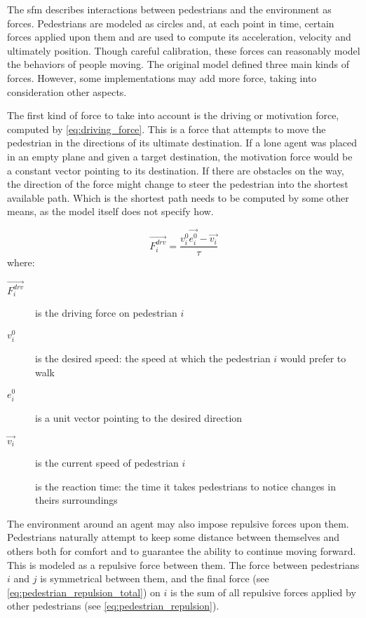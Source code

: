 \documentclass[twoside, 11pt]{article}
\begin{document}
The \gls{sfm} describes interactions between pedestrians and the environment as forces. Pedestrians are modeled as circles and, at each point in time, certain forces applied upon them and are used to compute its acceleration, velocity and ultimately position. Though careful calibration, these forces can reasonably model the behaviors of people moving. The original model defined three main kinds of forces. However, some implementations may add more force, taking into consideration other aspects.

The first kind of force to take into account is the driving or motivation force, computed by \autoref{eq:driving_force}. This is a force that attempts to move the pedestrian in the directions of its ultimate destination. If a lone agent was placed in an empty plane and given a target destination, the motivation force would be a constant vector pointing to its destination. If there are obstacles on the way, the direction of the force might change to steer the pedestrian into the shortest available path. Which is the shortest path needs to be computed by some other means, as the model itself does not specify how.

\begin{equation}
  \vec{F_i^{drv}} = \frac{v_i^0 \vec{e_i^0} - \vec{v_i}}{\tau}
  \label{eq:driving_force}
\end{equation}
where:
\begin{description}
  \item[$\vec{F_i^{drv}}$] is the driving force on pedestrian $i$
  \item[$v_i^0$] is the desired speed: the speed at which the pedestrian $i$ would prefer to walk
  \item[$e_i^0$] is a unit vector pointing to the desired direction
  \item[$\vec{v_i}$] is the current speed of pedestrian $i$
  \item[\tau] is the reaction time: the time it takes pedestrians to notice changes in theirs surroundings 
\end{description}

The environment around an agent may also impose repulsive forces upon them. Pedestrians naturally attempt to keep some distance between themselves and others both for comfort and to guarantee the ability to continue moving forward. This is modeled as a repulsive force between them. The force between pedestrians $i$ and $j$ is symmetrical between them, and the final force (see \autoref{eq:pedestrian_repulsion_total}) on $i$ is the sum of all repulsive forces applied by other pedestrians (see \autoref{eq:pedestrian_repulsion}).
\end{document}
